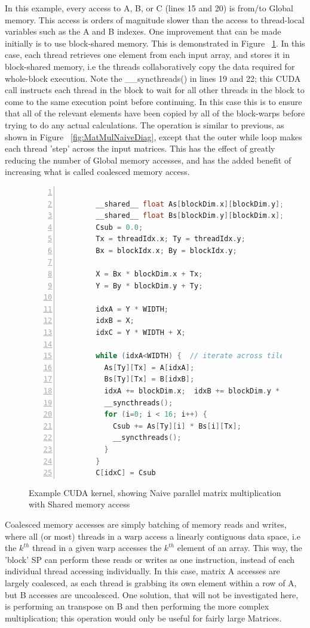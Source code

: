 In this example, every access to A, B, or C (lines 15 and 20) is from/to Global memory. This access is orders of magnitude slower than the access to thread-local variables such as the A and B indexes. One improvement that can be made initially is to use block-shared memory. This is demonstrated in Figure ~\ref{fig:MatMulShare}. In this case, each thread retrieves one element from each input array, and stores it in block-shared memory, i.e the threads collaboratively copy the data required for whole-block execution. Note the \_\_syncthreads() in lines 19 and 22; this CUDA call instructs each thread in the block to wait for all other threads in the block to come to the same execution point before continuing. In this case this is to ensure that all of the relevant elements have been copied by all of the block-warps before trying to do any actual calculations. The operation is similar to previous, as shown in Figure ~\ref{fig:MatMulNaiveDiag}, except that the outer while loop makes each thread 'step' across the input matrices. This has the effect of greatly reducing the number of Global memory accesses, and has the added benefit of increasing what is called coalesced memory access.

\begin{figure}[!h]
  \centering
    \begin{lstlisting}[numbers=left, language=C, numberstyle=\tiny, numbersep=8pt]

        __shared__ float As[blockDim.x][blockDim.y];
        __shared__ float Bs[blockDim.y][blockDim.x];
        Csub = 0.0;
        Tx = threadIdx.x; Ty = threadIdx.y;
        Bx = blockIdx.x; By = blockIdx.y;

        X = Bx * blockDim.x + Tx;
        Y = By * blockDim.y + Ty;

        idxA = Y * WIDTH;   
        idxB = X;
        idxC = Y * WIDTH + X;

        while (idxA<WIDTH) {  // iterate across tiles
          As[Ty][Tx] = A[idxA];
          Bs[Ty][Tx] = B[idxB];
          idxA += blockDim.x;  idxB += blockDim.y * WIDTH;
          __syncthreads();
          for (i=0; i < 16; i++) {
            Csub += As[Ty][i] * Bs[i][Tx];
            __syncthreads();
          }
        }
        C[idxC] = Csub
    \end{lstlisting}
  \caption{Example CUDA kernel, showing Naive parallel matrix multiplication with Shared memory access}
  \label{fig:MatMulShare}
\end{figure}

Coalesced memory accesses are simply batching of memory reads and writes, where all (or most) threads in a warp access a linearly contiguous data space, i.e the \(k^{th}\) thread in a given warp accesses the \(k^{th}\) element of an array. This way, the 'block' SP can perform these reads or writes as one instruction, instead of each individual thread accessing individually. In this case, matrix A accesses are largely coalesced, as each thread is grabbing its own element within a row of A, but B accesses are uncoalesced. One solution, that will not be investigated here, is performing an transpose on B and then performing the more complex multiplication; this operation would only be useful for fairly large Matrices.

